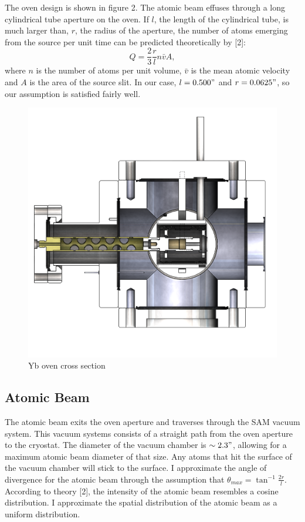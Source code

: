 \documentclass[12pt, a4paper]{article}
\begin{document}
The oven design is shown in figure 2. The atomic beam effuses through a long cylindrical tube aperture on the oven. If $l$, the length of the cylindrical tube, is much larger than, $r$, the radius of the aperture, the number of atoms emerging from the source per unit time can be predicted theoretically by [2]:
\begin{equation}
Q = \frac{2}{3}\frac{r}{l}n\bar{v}A,
\end{equation}
where $n$ is the number of atoms per unit volume, $\bar{v}$ is the mean atomic velocity and $A$ is the area of the source slit. In our case, $l = 0.500"$ and $r = 0.0625"$, so our assumption is satisfied fairly well.
\begin{figure}[h]
\centering
\captionsetup{justification=centering}
  \includegraphics[scale=0.22]{ybOvenCrosssection.PNG}
  \vspace*{-3mm}
  \caption{Yb oven cross section}
\end{figure}

\subsection{Atomic Beam}
The atomic beam exits the oven aperture and traverses through the SAM vacuum system. This vacuum systems consists of a straight path from the oven aperture to the cryostat. The diameter of the vacuum chamber is $\sim 2.3"$, allowing for a maximum atomic beam diameter of that size. Any atoms that hit the surface of the vacuum chamber will stick to the surface. I approximate the angle of divergence for the atomic beam through the assumption that $\theta_{max} = \tan^{-1}\frac{2r}{l}$. According to theory [2], the intensity of the atomic beam resembles a cosine distribution. I approximate the spatial distribution of the atomic beam as a uniform distribution.
\end{document}
